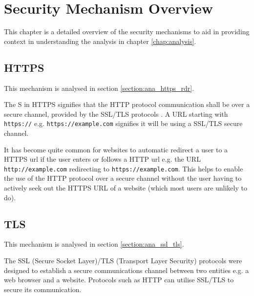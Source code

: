 \documentclass{mscreport}
\begin{document}
%



\chapter{Security Mechanism Overview}
\label{chap:sec_mech_overview}

This chapter is a detailed overview of the security mechanisms to aid in providing context in understanding the analysis in chapter \ref{chap:analysis}.

\section{HTTPS}
\label{section:bg_https}

This mechanism is analysed in section \ref{section:ana_https_rdr}.

\vspace{0.3cm} \noindent
The S in HTTPS signifies that the HTTP protocol communication shall be over a secure channel, provided by the SSL/TLS protocols \cite{Rescorla2000-fs}. A URL starting with \texttt{https://} e.g. \texttt{https://example.com} signifies it will be using a SSL/TLS secure channel.

\vspace{0.3cm} \noindent
It has become quite common for websites to automatic redirect a user to a HTTPS url if the user enters or follows a HTTP url e.g. the URL \texttt{http://example.com} redirecting to \texttt{https://example.com}. This helps to enable the use of the HTTP protocol over a secure channel without the user having to actively seek out the HTTPS URL of a website (which most users are unlikely to do).

\section{TLS}
\label{section:bg_tls}

This mechanism is analysed in section \ref{section:ana_ssl_tls}.

\vspace{0.3cm} \noindent
The SSL (Secure Socket Layer)/TLS (Transport Layer Security) protocols were designed to establish a secure communications channel between two entities e.g. a web browser and a website. Protocols such as HTTP can utilise SSL/TLS to secure its communication.
\end{document}
